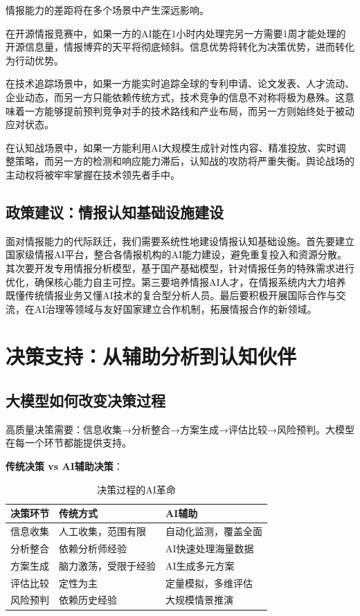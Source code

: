 情报能力的差距将在多个场景中产生深远影响。

在开源情报竞赛中，如果一方的AI能在1小时内处理完另一方需要1周才能处理的开源信息量，情报博弈的天平将彻底倾斜。信息优势将转化为决策优势，进而转化为行动优势。

在技术追踪场景中，如果一方能实时追踪全球的专利申请、论文发表、人才流动、企业动态，而另一方只能依赖传统方式，技术竞争的信息不对称将极为悬殊。这意味着一方能够提前预判竞争对手的技术路线和产业布局，而另一方则始终处于被动应对状态。

在认知战场景中，如果一方能利用AI大规模生成针对性内容、精准投放、实时调整策略，而另一方的检测和响应能力滞后，认知战的攻防将严重失衡。舆论战场的主动权将被牢牢掌握在技术领先者手中。

\subsection{政策建议：情报认知基础设施建设}

面对情报能力的代际跃迁，我们需要系统性地建设情报认知基础设施。首先要建立国家级情报AI平台，整合各情报机构的AI能力建设，避免重复投入和资源分散。其次要开发专用情报分析模型，基于国产基础模型，针对情报任务的特殊需求进行优化，确保核心能力自主可控。第三要培养情报AI人才，在情报系统内大力培养既懂传统情报业务又懂AI技术的复合型分析人员。最后要积极开展国际合作与交流，在AI治理等领域与友好国家建立合作机制，拓展情报合作的新领域。

\section{决策支持：从辅助分析到认知伙伴}

\subsection{大模型如何改变决策过程}

高质量决策需要：信息收集→分析整合→方案生成→评估比较→风险预判。大模型在每一个环节都能提供支持。

\textbf{传统决策 vs AI辅助决策}：

\begin{table}[H]
\centering
\caption{决策过程的AI革命}
\small
\begin{tabular}{p{2.5cm}p{4.5cm}p{4.5cm}}
\toprule
\textbf{决策环节} & \textbf{传统方式} & \textbf{AI辅助} \\
\midrule
信息收集 & 人工收集，范围有限 & 自动化监测，覆盖全面 \\
分析整合 & 依赖分析师经验 & AI快速处理海量数据 \\
方案生成 & 脑力激荡，受限于经验 & AI生成多元方案 \\
评估比较 & 定性为主 & 定量模拟，多维评估 \\
风险预判 & 依赖历史经验 & 大规模情景推演 \\
\bottomrule
\end{tabular}
\end{table}

